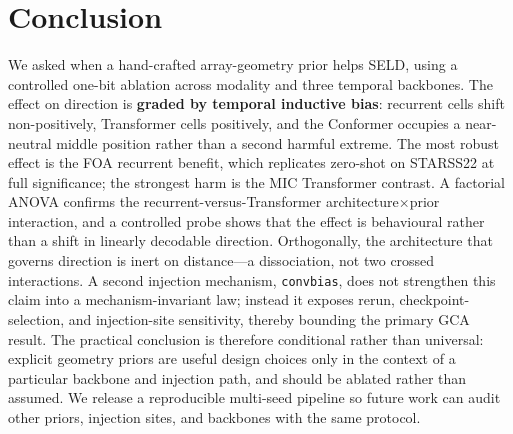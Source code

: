 \section{Conclusion}
\label{sec:conclusion}

We asked when a hand-crafted array-geometry prior helps SELD, using a controlled
one-bit ablation across modality and three temporal backbones. The effect on
direction is \textbf{graded by temporal inductive bias}: recurrent cells shift
non-positively, Transformer cells positively, and the Conformer occupies a
near-neutral middle position rather than a second harmful extreme. The most
robust effect is the FOA recurrent benefit, which replicates zero-shot on
STARSS22 at full significance; the strongest harm is the MIC Transformer
contrast. A factorial ANOVA confirms the recurrent-versus-Transformer
architecture$\times$prior interaction, and a controlled probe shows that the
effect is behavioural rather than a shift in linearly decodable direction.
Orthogonally, the architecture that governs direction is inert on distance---a
dissociation, not two crossed interactions. A second injection mechanism,
\texttt{convbias}, does not strengthen this claim into a mechanism-invariant
law; instead it exposes rerun, checkpoint-selection, and injection-site
sensitivity, thereby bounding the primary GCA result. The practical conclusion
is therefore conditional rather than universal: explicit geometry priors are
useful design choices only in the context of a particular backbone and injection
path, and should be ablated rather than assumed. We release a reproducible
multi-seed pipeline so future work can audit other priors, injection sites, and
backbones with the same protocol.
